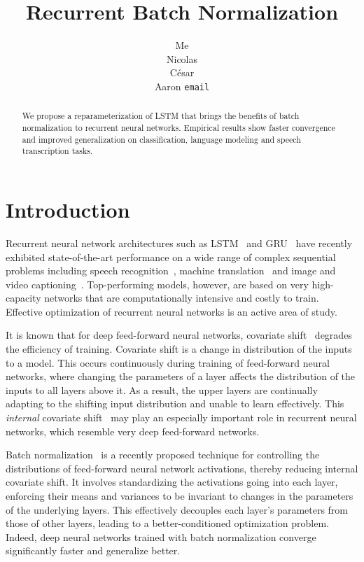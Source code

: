 \documentclass{article} %
\title{Recurrent Batch Normalization}
\author{
Me \\
\And
Nicolas \\
\And
C\'esar \\
\And
Aaron
\texttt{email} \\
}
\begin{document}
\maketitle

\begin{abstract}
We propose a reparameterization of LSTM that brings the benefits of batch normalization to recurrent neural networks.
Empirical results show faster convergence and improved generalization on classification, language modeling and speech transcription tasks.
\end{abstract}

\section{Introduction}

Recurrent neural network architectures such as LSTM~\cite{lstm} and GRU~\cite{cho2014learning} have recently exhibited
state-of-the-art performance on a wide range of complex sequential problems including speech recognition~\cite{baidu},
machine translation~\cite{bahdanau2014neural} and image and video captioning~\cite{xu2015show,yao2015describing}.
Top-performing models, however, are based on very high-capacity networks that are computationally intensive and costly to train.
Effective optimization of recurrent neural networks is an active area of study.

It is known that for deep feed-forward neural networks, covariate shift~\cite{shimodaira2000improving,batchnorm}
degrades the efficiency of training.
Covariate shift is a change in distribution of the inputs to a model.
This occurs continuously during training of feed-forward neural networks,
where changing the parameters of a layer affects the distribution of the inputs to all layers above it.
As a result, the upper layers are continually adapting to the shifting input distribution and unable to learn effectively.
This \emph{internal} covariate shift~\cite{batchnorm} may play an especially important role in recurrent neural networks,
which resemble very deep feed-forward networks.

Batch normalization~\cite{batchnorm} is a recently proposed technique for controlling the distributions of feed-forward neural network activations, thereby reducing internal covariate shift.
It involves standardizing the activations going into each layer, enforcing their means and variances to be invariant to changes in the parameters of the underlying layers.
This effectively decouples each layer's parameters from those of other layers, leading to a better-conditioned optimization problem.
Indeed, deep neural networks trained with batch normalization converge significantly faster and generalize better.
\end{document}

